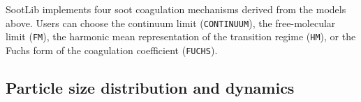 \documentclass[preprint,letterpaper]{elsarticle}
\begin{document}

SootLib implements four soot coagulation mechanisms derived from the models above. Users can choose the continuum limit (\texttt{CONTINUUM}), the free-molecular limit (\texttt{FM}), the harmonic mean representation of the transition regime (\texttt{HM}), or the Fuchs form of the coagulation coefficient (\texttt{FUCHS}).

\subsection{Particle size distribution and dynamics}
\label{s:PSD_dynamics}
\end{document}
